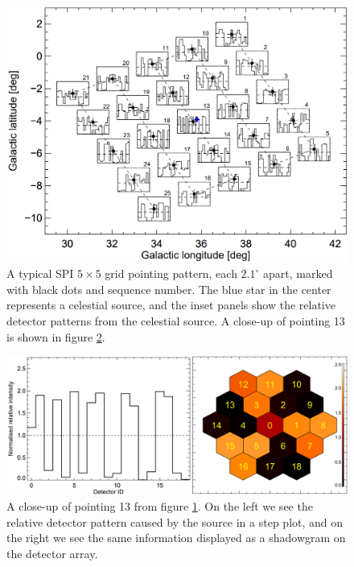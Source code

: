 \documentclass{report}
\begin{document}
\begin{figure}
  \centering
  \includegraphics[width=\textwidth]{Images/General/Siegert_PHD_Pointings_pattern.PNG}
  \caption{A typical SPI $5\times5$ grid pointing pattern, each $2.1^\circ$ apart, marked with black dots and sequence number. The blue star in the center represents a celestial source, and the inset panels show the relative detector patterns from the celestial source. A close-up of pointing 13 is shown in figure \ref{spegert_pointings_pattern_close_up}. \cite{dissertation}}
  \label{spegert_pointings_pattern}
\end{figure}

\begin{figure}
  \centering
  \includegraphics[width=\textwidth]{Images/General/Siegert_PHD_P13.PNG}
  \caption{A close-up of pointing 13 from figure \ref{spegert_pointings_pattern}. On the left we see the relative detector pattern caused by the source in a step plot, and on the right we see the same information displayed as a shadowgram on the detector array. \cite{dissertation}}
  \label{spegert_pointings_pattern_close_up}
\end{figure}
\end{document}
